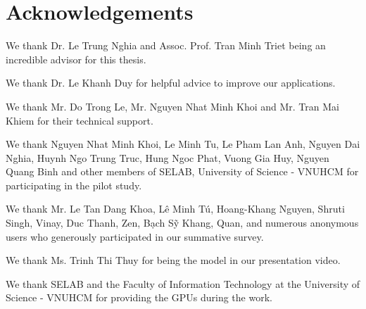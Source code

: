 \chapter*{Acknowledgements}
\label{ack}
We thank Dr. Le Trung Nghia and Assoc. Prof. Tran Minh Triet being an incredible advisor for this thesis. 

We thank Dr. Le Khanh Duy for helpful advice to improve our applications.

We thank Mr. Do Trong Le, Mr. Nguyen Nhat Minh Khoi and Mr. Tran Mai Khiem for their technical support.

We thank Nguyen Nhat Minh Khoi, Le Minh Tu, Le Pham Lan Anh, Nguyen Dai Nghia, Huynh Ngo Trung Truc, Hung Ngoc Phat, Vuong Gia Huy, Nguyen Quang Binh and other members of SELAB, University of Science - VNUHCM for participating in the pilot study.

We thank Mr. Le Tan Dang Khoa, Lê Minh Tú, Hoang-Khang Nguyen, Shruti Singh, Vinay, Duc Thanh, Zen, Bạch Sỹ Khang, Quan, and numerous anonymous users who generously participated in our summative survey.

We thank Ms. Trinh Thi Thuy for being the model in our presentation video.

We thank SELAB and the Faculty of Information Technology at the University of Science - VNUHCM for providing the GPUs during the work.